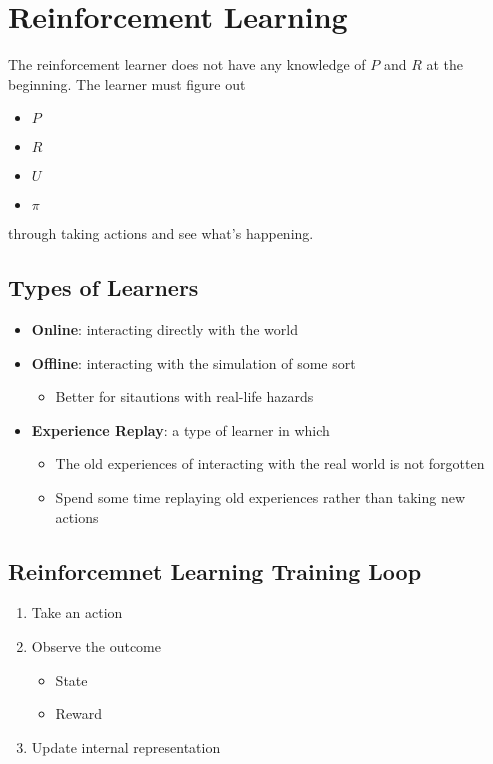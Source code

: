 \section{Reinforcement Learning}

  The reinforcement learner does not have any knowledge of $ P $ and
  $ R $ at the beginning. The learner must figure out

  \begin{itemize}
    \item $ P $
    \item $ R $
    \item $ U $
    \item $ \pi $
  \end{itemize}

  through taking actions and see what's happening.

  \subsection{Types of Learners}

    \begin{itemize}
      \item \textbf{Online}: interacting directly with the world
      \item \textbf{Offline}: interacting with the simulation of some sort
      \begin{itemize}
        \item Better for sitautions with real-life hazards
      \end{itemize}

      \item \textbf{Experience Replay}: a type of learner in which
      \begin{itemize}
        \item The old experiences of interacting with the real world
        is not forgotten
        \item Spend some time replaying old experiences rather than taking new
        actions
      \end{itemize}
    \end{itemize}

  \subsection{Reinforcemnet Learning Training Loop}

    \begin{enumerate}
      \item Take an action
      \item Observe the outcome
      \begin{itemize}
        \item State
        \item Reward
      \end{itemize}

      \item Update internal representation
    \end{enumerate}


